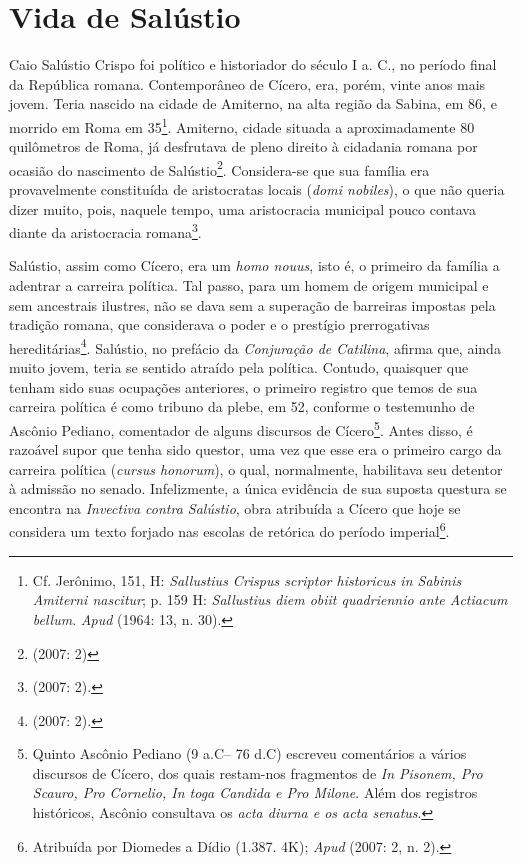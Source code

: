 \section{Vida de Salústio}

Caio Salústio Crispo foi político e historiador do século I a. C., no período
final da República romana.  Contemporâneo de Cícero, era, porém, vinte anos
mais jovem. Teria nascido na cidade de Amiterno, na alta região da Sabina, em
86, e morrido em Roma em 35\footnote{Cf. Jerônimo,  151, H:
\emph{Sallustius Crispus scriptor historicus in Sabinis Amiterni nascitur}; p.
159 H: \emph{Sallustius diem obiit quadriennio ante Actiacum bellum}.
\emph{Apud}  (1964:  13, n. 30).}. Amiterno, cidade situada
a aproximadamente 80 quilômetros de Roma, já desfrutava de pleno direito à
cidadania romana por ocasião do nascimento de Salústio\footnote{ (2007: 2)}. Considera-se que sua família era provavelmente constituída de
aristocratas locais (\emph{domi nobiles}), o que não queria dizer muito, pois,
naquele tempo, uma aristocracia municipal pouco contava diante da aristocracia
romana\footnote{ (2007: 2).}. 

Salústio, assim como Cícero, era um \emph{homo nouus}, isto é, o primeiro da
família a adentrar a carreira política. Tal passo, para um homem de origem
municipal e sem ancestrais ilustres, não se dava sem a superação de barreiras
impostas pela tradição romana, que considerava o poder e o prestígio
prerrogativas hereditárias\footnote{ (2007: 2).}.  Salústio, no prefácio
da \emph{Conjuração de Catilina}, afirma que, ainda muito jovem, teria se
sentido atraído pela política. Contudo, quaisquer que tenham sido suas
ocupações anteriores, o primeiro registro que temos de sua carreira política é
como tribuno da plebe, em 52,  conforme o testemunho de Ascônio Pediano,
comentador de alguns discursos de Cícero\footnote{Quinto Ascônio Pediano (9
a.C-- 76 d.C) escreveu comentários a vários discursos de Cícero, dos quais
restam-nos fragmentos de \emph{In Pisonem, Pro Scauro, Pro Cornelio, In toga
Candida e Pro Milone}. Além dos registros históricos, Ascônio consultava os
\emph{acta diurna e os acta senatus}.}. Antes disso, é razoável supor que tenha
sido questor, uma vez que esse era o primeiro cargo da carreira política
(\emph{cursus honorum}), o qual, normalmente, habilitava seu detentor à
admissão no senado. Infelizmente, a única evidência de sua suposta questura se
encontra na \emph{Invectiva contra Salústio}, obra atribuída a Cícero que hoje
se considera um texto forjado nas escolas de retórica do período
imperial\footnote{Atribuída por
Diomedes a Dídio (1.387. 4K); \emph{Apud}   (2007: 2, n. 2).}.   

